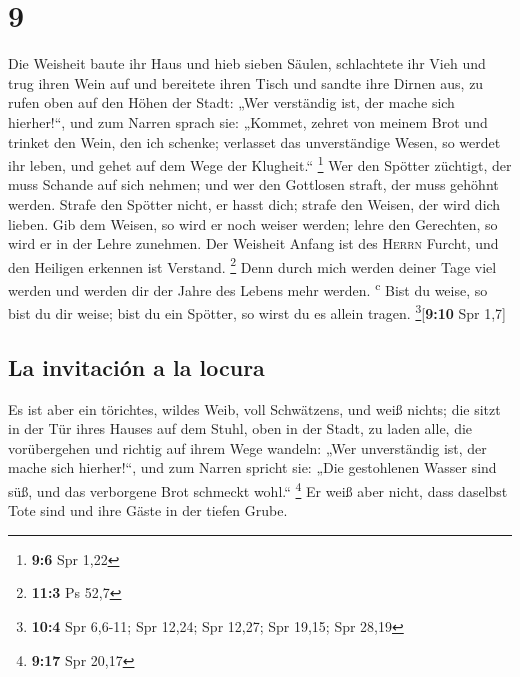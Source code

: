 \hypertarget{section-8}{%
\section{9}\label{section-8}}

 Die Weisheit baute ihr Haus und hieb sieben Säulen,
 schlachtete ihr Vieh und trug ihren Wein auf und
bereitete ihren Tisch  und sandte ihre Dirnen aus, zu
rufen oben auf den Höhen der Stadt:  „Wer verständig ist,
der mache sich hierher!{}``, und zum Narren sprach sie: 
„Kommet, zehret von meinem Brot und trinket den Wein, den ich schenke;
 verlasset das unverständige Wesen, so werdet ihr leben,
und gehet auf dem Wege der Klugheit.`` \footnote{\textbf{9:6} Spr 1,22}
 Wer den Spötter züchtigt, der muss Schande auf sich
nehmen; und wer den Gottlosen straft, der muss gehöhnt werden.
 Strafe den Spötter nicht, er hasst dich; strafe den
Weisen, der wird dich lieben.  Gib dem Weisen, so wird er
noch weiser werden; lehre den Gerechten, so wird er in der Lehre
zunehmen.  Der Weisheit Anfang ist des \textsc{Herrn}
Furcht, und den Heiligen erkennen ist Verstand. \footnote{\textbf{11:3}
  Ps 52,7}  Denn durch mich werden deiner Tage viel
werden und werden dir der Jahre des Lebens mehr werden.
\textsuperscript{c}  Bist du weise, so bist du dir weise;
bist du ein Spötter, so wirst du es allein tragen.
\footnote{\textbf{10:4} Spr 6,6-11; Spr 12,24; Spr 12,27; Spr 19,15; Spr
  28,19}{[}\textbf{9:10} Spr 1,7{]}

\hypertarget{la-invitaciuxf3n-a-la-locura}{%
\subsection{La invitación a la
locura}\label{la-invitaciuxf3n-a-la-locura}}

 Es ist aber ein törichtes, wildes Weib, voll Schwätzens,
und weiß nichts;  die sitzt in der Tür ihres Hauses auf
dem Stuhl, oben in der Stadt,  zu laden alle, die
vorübergehen und richtig auf ihrem Wege wandeln:  „Wer
unverständig ist, der mache sich hierher!{}``, und zum Narren spricht
sie:  „Die gestohlenen Wasser sind süß, und das
verborgene Brot schmeckt wohl.`` \footnote{\textbf{9:17} Spr 20,17}
 Er weiß aber nicht, dass daselbst Tote sind und ihre
Gäste in der tiefen Grube.

